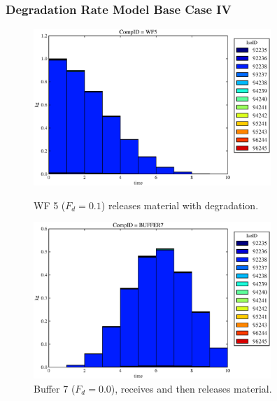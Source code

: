 \begin{frame}
  \frametitle{Degradation Rate Model Base Case IV}
  \begin{figure}
\begin{minipage}[b]{0.45\linewidth}

  \includegraphics[width=0.8\textwidth]{./images/drIV1.eps}
  \caption[DRIV WF Contaminants.]{
    WF 5 ($F_d = 0.1$) releases material with degradation. 
    }
  \label{fig:drIVwf5}
  
  \includegraphics[width=0.8\textwidth]{./images/drIV3.eps}
  \caption[Case DRIV Buffer Contaminants]{
    Buffer 7 ($F_d=0.0$), receives and then releases material.
    }
  \label{fig:drIVbuff}


\end{minipage}
\end{figure}
\end{frame}
